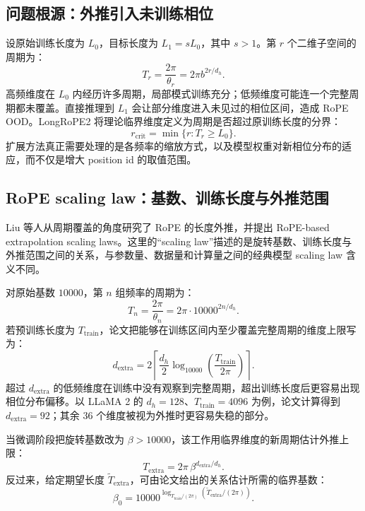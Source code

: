 \documentclass[UTF8,fontset=none,a4paper,10pt]{ctexart}
\begin{document}
\subsection{问题根源：外推引入未训练相位}

设原始训练长度为 $L_0$，目标长度为 $L_1=sL_0$，其中 $s>1$。第 $r$ 个二维子空间的周期为：
\begin{equation}
  T_r=\frac{2\pi}{\theta_r}=2\pi b^{2r/d_h}.
  \label{eq:rope-period}
\end{equation}
高频维度在 $L_0$ 内经历许多周期，局部模式训练充分；低频维度可能连一个完整周期都未覆盖。直接推理到 $L_1$ 会让部分维度进入未见过的相位区间，造成 RoPE OOD。LongRoPE2 将理论临界维度定义为周期是否超过原训练长度的分界\cite{longrope2}：
\begin{equation}
  r_{\mathrm{crit}}=\min\{r:T_r\ge L_0\}.
  \label{eq:critical-dim}
\end{equation}
扩展方法真正需要处理的是各频率的缩放方式，以及模型权重对新相位分布的适应，而不仅是增大 position id 的取值范围。

\subsection{RoPE scaling law：基数、训练长度与外推范围}

Liu 等人从周期覆盖的角度研究了 RoPE 的长度外推，并提出 RoPE-based extrapolation scaling laws\cite{liu2024scalingrope}。这里的“scaling law”描述的是旋转基数、训练长度与外推范围之间的关系，与参数量、数据量和计算量之间的经典模型 scaling law 含义不同。

对原始基数 $10000$，第 $n$ 组频率的周期为：
\begin{equation}
  T_n=\frac{2\pi}{\theta_n}=2\pi\cdot10000^{2n/d_h}.
  \label{eq:scaling-period}
\end{equation}
若预训练长度为 $T_{\mathrm{train}}$，论文把能够在训练区间内至少覆盖完整周期的维度上限写为：
\begin{equation}
  d_{\mathrm{extra}}
  =2\left\lceil
  \frac{d_h}{2}\log_{10000}\!\left(\frac{T_{\mathrm{train}}}{2\pi}\right)
  \right\rceil.
  \label{eq:critical-dimension-scaling-law}
\end{equation}
超过 $d_{\mathrm{extra}}$ 的低频维度在训练中没有观察到完整周期，超出训练长度后更容易出现相位分布偏移。以 LLaMA 2 的 $d_h=128$、$T_{\mathrm{train}}=4096$ 为例，论文计算得到 $d_{\mathrm{extra}}=92$；其余 36 个维度被视为外推时更容易失稳的部分\cite{liu2024scalingrope}。

当微调阶段把旋转基数改为 $\beta>10000$，该工作用临界维度的新周期估计外推上限：
\begin{equation}
  T_{\mathrm{extra}}
  =2\pi\,\beta^{d_{\mathrm{extra}}/d_h}.
  \label{eq:scaling-law-upper-bound}
\end{equation}
反过来，给定期望长度 $\widetilde T_{\mathrm{extra}}$，可由论文给出的关系估计所需的临界基数：
\begin{equation}
  \beta_0
  =10000^{\log_{T_{\mathrm{train}}/(2\pi)}
  \left(\widetilde T_{\mathrm{extra}}/(2\pi)\right)}.
  \label{eq:scaling-law-critical-base}
\end{equation}
\end{document}
